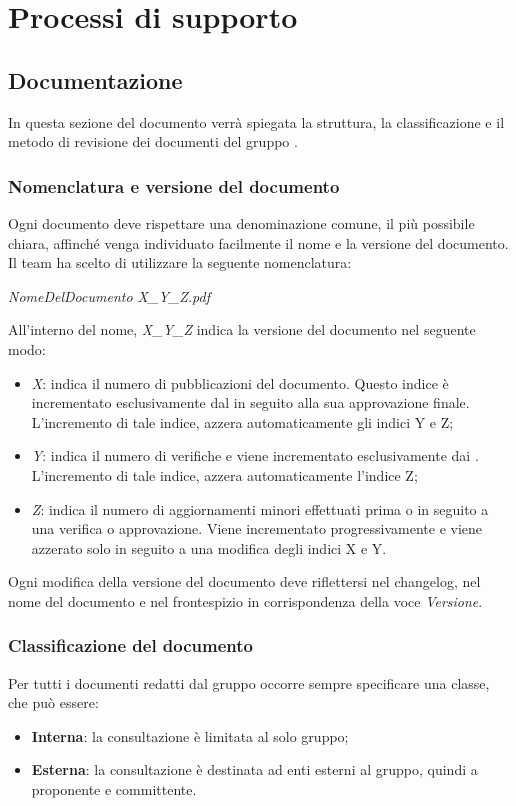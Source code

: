 \newpage

\section{Processi di supporto}

	\subsection{Documentazione}
	In questa sezione del documento verrà spiegata la struttura, la classificazione e il metodo di revisione dei documenti del gruppo \textit{\gruppo}.
	
		\subsubsection{Nomenclatura e versione del documento}
		Ogni documento deve rispettare una denominazione comune, il più possibile chiara, affinché venga individuato facilmente il nome e la versione del documento. Il team ha scelto di utilizzare la seguente nomenclatura:
		\begin{center}
			\textit{NomeDelDocumento X\_Y\_Z.pdf}
		\end{center}
		All'interno del nome, \textit{X\_Y\_Z} indica la versione del documento nel seguente modo:
		\begin{itemize}
			\item \textit{X}: indica il numero di pubblicazioni del documento. Questo indice è incrementato esclusivamente dal \textit{\RdP} in seguito alla sua approvazione finale. L’incremento di tale indice, azzera automaticamente gli indici Y e Z;
			\item \textit{Y}: indica il numero di verifiche e viene incrementato esclusivamente dai \textit{\Vers}. L'incremento di tale indice, azzera automaticamente l'indice Z;
			\item \textit{Z}: indica il numero di aggiornamenti minori effettuati prima o in seguito a una verifica o approvazione. Viene incrementato progressivamente e viene azzerato solo in seguito a una modifica degli indici X e Y.
		\end{itemize}
		Ogni modifica della versione del documento deve riflettersi nel changelog, nel nome del documento e nel frontespizio in corrispondenza della voce \textit{Versione}.
	
		\subsubsection{Classificazione del documento}
		Per tutti i documenti redatti dal gruppo occorre sempre specificare una classe, che può essere:
		\begin{itemize}
		\item \textbf{Interna}: la consultazione è limitata al solo gruppo;
		\item \textbf{Esterna}: la consultazione è destinata ad enti esterni al gruppo, quindi a proponente e committente.
		\end{itemize} 
	

